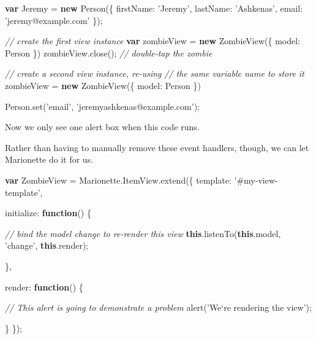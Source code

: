 \documentclass[9pt]{book}
\newenvironment{Shaded}{}{}
\newcommand{\KeywordTok}[1]{\textcolor[rgb]{0.00,0.44,0.13}{\textbf{{#1}}}}
\newcommand{\DataTypeTok}[1]{\textcolor[rgb]{0.56,0.13,0.00}{{#1}}}
\newcommand{\StringTok}[1]{\textcolor[rgb]{0.25,0.44,0.63}{{#1}}}
\newcommand{\CommentTok}[1]{\textcolor[rgb]{0.38,0.63,0.69}{\textit{{#1}}}}
\newcommand{\OtherTok}[1]{\textcolor[rgb]{0.00,0.44,0.13}{{#1}}}
\newcommand{\FunctionTok}[1]{\textcolor[rgb]{0.02,0.16,0.49}{{#1}}}
\newcommand{\NormalTok}[1]{{#1}}
\begin{document}
\begin{Shaded}
\begin{Highlighting}[]
\KeywordTok{var} \NormalTok{Jeremy = }\KeywordTok{new} \FunctionTok{Person}\NormalTok{(\{}
  \DataTypeTok{firstName}\NormalTok{: }\StringTok{'Jeremy'}\NormalTok{,}
  \DataTypeTok{lastName}\NormalTok{: }\StringTok{'Ashkenas'}\NormalTok{,}
  \DataTypeTok{email}\NormalTok{: }\StringTok{'jeremy@example.com'}
\NormalTok{\});}

\CommentTok{// create the first view instance}
\KeywordTok{var} \NormalTok{zombieView = }\KeywordTok{new} \FunctionTok{ZombieView}\NormalTok{(\{}
  \DataTypeTok{model}\NormalTok{: Person}
\NormalTok{\})}
\OtherTok{zombieView}\NormalTok{.}\FunctionTok{close}\NormalTok{(); }\CommentTok{// double-tap the zombie}

\CommentTok{// create a second view instance, re-using}
\CommentTok{// the same variable name to store it}
\NormalTok{zombieView = }\KeywordTok{new} \FunctionTok{ZombieView}\NormalTok{(\{}
  \DataTypeTok{model}\NormalTok{: Person}
\NormalTok{\})}

\OtherTok{Person}\NormalTok{.}\FunctionTok{set}\NormalTok{(}\StringTok{'email'}\NormalTok{, }\StringTok{'jeremyashkenas@example.com'}\NormalTok{);}
\end{Highlighting}
\end{Shaded}

Now we only see one alert box when this code runs.

Rather than having to manually remove these event handlers, though, we
can let Marionette do it for us.

\begin{Shaded}
\begin{Highlighting}[]
\KeywordTok{var} \NormalTok{ZombieView = }\OtherTok{Marionette}\NormalTok{.}\OtherTok{ItemView}\NormalTok{.}\FunctionTok{extend}\NormalTok{(\{}
  \DataTypeTok{template}\NormalTok{: }\StringTok{'#my-view-template'}\NormalTok{,}

  \DataTypeTok{initialize}\NormalTok{: }\KeywordTok{function}\NormalTok{() \{}

    \CommentTok{// bind the model change to re-render this view}
    \KeywordTok{this}\NormalTok{.}\FunctionTok{listenTo}\NormalTok{(}\KeywordTok{this}\NormalTok{.}\FunctionTok{model}\NormalTok{, }\StringTok{'change'}\NormalTok{, }\KeywordTok{this}\NormalTok{.}\FunctionTok{render}\NormalTok{);}

  \NormalTok{\},}

  \DataTypeTok{render}\NormalTok{: }\KeywordTok{function}\NormalTok{() \{}

    \CommentTok{// This alert is going to demonstrate a problem}
    \FunctionTok{alert}\NormalTok{(}\StringTok{'We`re rendering the view'}\NormalTok{);}

  \NormalTok{\}}
\NormalTok{\});}
\end{Highlighting}
\end{Shaded}
\end{document}
